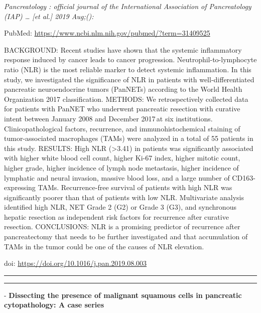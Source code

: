 \documentclass[]{article}
\begin{document}
\emph{Pancreatology : official journal of the International Association
of Pancreatology (IAP) \ldots{} {[}et al.{]} 2019 Aug;():}

PubMed: \url{https://www.ncbi.nlm.nih.gov/pubmed/?term=31409525}

BACKGROUND: Recent studies have shown that the systemic inflammatory
response induced by cancer leads to cancer progression.
Neutrophil-to-lymphocyte ratio (NLR) is the most reliable marker to
detect systemic inflammation. In this study, we investigated the
significance of NLR in patients with well-differentiated pancreatic
neuroendocrine tumors (PanNETs) according to the World Health
Organization 2017 classification. METHODS: We retrospectively collected
data for patients with PanNET who underwent pancreatic resection with
curative intent between January 2008 and December 2017\,at six
institutions. Clinicopathological factors, recurrence, and
immunohistochemical staining of tumor-associated macrophages (TAMs) were
analyzed in a total of 55 patients in this study. RESULTS: High NLR
(\textgreater{}3.41) in patients was significantly associated with
higher white blood cell count, higher Ki-67 index, higher mitotic count,
higher grade, higher incidence of lymph node metastasis, higher
incidence of lymphatic and neural invasion, massive blood loss, and a
large number of CD163-expressing TAMs. Recurrence-free survival of
patients with high NLR was significantly poorer than that of patients
with low NLR. Multivariate analysis identified high NLR, NET Grade 2
(G2) or Grade 3 (G3), and synchronous hepatic resection as independent
risk factors for recurrence after curative resection. CONCLUSIONS: NLR
is a promising predictor of recurrence after pancreatectomy that needs
to be further investigated and that accumulation of TAMs in the tumor
could be one of the causes of NLR elevation.

doi: \url{https://doi.org/10.1016/j.pan.2019.08.003}

{}

{}

\begin{center}\rule{0.5\linewidth}{\linethickness}\end{center}

\begin{center}\rule{0.5\linewidth}{\linethickness}\end{center}

 - \textbf{Dissecting the presence of malignant squamous cells in
pancreatic cytopathology: A case series}
\end{document}
